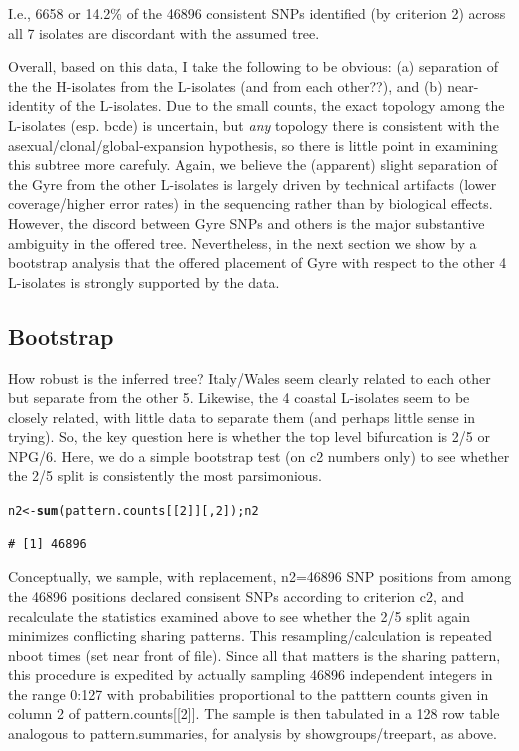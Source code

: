 \documentclass{article}\usepackage[]{graphicx}\usepackage[]{color}
\makeatletter
\newcommand{\hlnum}[1]{\textcolor[rgb]{0.686,0.059,0.569}{#1}}%
\newcommand{\hlstd}[1]{\textcolor[rgb]{0.345,0.345,0.345}{#1}}%
\newcommand{\hlkwb}[1]{\textcolor[rgb]{0.69,0.353,0.396}{#1}}%
\newcommand{\hlkwd}[1]{\textcolor[rgb]{0.737,0.353,0.396}{\textbf{#1}}}%
\newenvironment{kframe}{%
 \def\at@end@of@kframe{}%
 \ifinner\ifhmode%
  \def\at@end@of@kframe{\end{minipage}}%
  \begin{minipage}{\columnwidth}%
 \fi\fi%
 \def\FrameCommand##1{\hskip\@totalleftmargin \hskip-\fboxsep
 \colorbox{shadecolor}{##1}\hskip-\fboxsep
     \hskip-\linewidth \hskip-\@totalleftmargin \hskip\columnwidth}%
 \MakeFramed {\advance\hsize-\width
   \@totalleftmargin\z@ \linewidth\hsize
   \@setminipage}}%
 {\par\unskip\endMakeFramed%
 \at@end@of@kframe}
\newenvironment{knitrout}{}{} %
\makeatother
\begin{document}
I.e., 6658 or 14.2\% of the 46896 consistent SNPs identified (by criterion 2) across all 7 isolates are discordant with the assumed tree.

Overall, based on this data, I take the following to be obvious: (a) separation of the the H-isolates from the L-isolates (and from each other??), and (b) near-identity of the L-isolates.  Due to the small counts, the exact topology among the L-isolates (esp. bcde) is uncertain, but \emph{any} topology there is consistent with the asexual/clonal/global-expansion hypothesis, so there is little point in examining this subtree more carefuly. Again, we believe the (apparent) slight separation of the Gyre from the other L-isolates is largely driven by technical artifacts (lower coverage/higher error rates) in the sequencing rather than by biological effects.  However, the discord between Gyre SNPs and others is the major substantive ambiguity in the offered tree.  Nevertheless, in the next section we show by a bootstrap analysis that the offered placement of Gyre with respect to the other 4 L-isolates is strongly supported by the data.

\subsection{Bootstrap}
How robust is the inferred tree?  Italy/Wales seem clearly related to each other but separate from the other 5.
Likewise, the 4 coastal L-isolates seem to be closely related, with little data to separate them (and perhaps little sense in
trying).  So, the key question here is whether the top level bifurcation is 2/5 or NPG/6.  Here, we do a simple
bootstrap test (on c2 numbers only) to see whether the 2/5 split is consistently the most parsimonious.

\begin{knitrout}\footnotesize
{}\color{fgcolor}\begin{kframe}
\begin{alltt}
\hlstd{n2} \hlkwb{<-} \hlkwd{sum}\hlstd{(pattern.counts[[}\hlnum{2}\hlstd{]][,}\hlnum{2}\hlstd{]); n2}
\end{alltt}
\begin{verbatim}
# [1] 46896
\end{verbatim}
\end{kframe}
\end{knitrout}

Conceptually, we sample, with replacement, n2=46896 SNP positions from among the
46896 positions declared consisent SNPs according to criterion c2, and recalculate the
statistics examined above to see whether the 2/5 split again minimizes conflicting sharing patterns.  This
resampling/calculation is repeated nboot times (set near front of file). Since all that matters is the sharing pattern, this
procedure is expedited by actually sampling 46896 independent integers in the range 0:127 with
probabilities proportional to the patttern counts given in column 2 of pattern.counts[[2]].  The sample is then
tabulated in a 128 row table analogous to pattern.summaries, for analysis by showgroups/treepart, as above.
\end{document}

